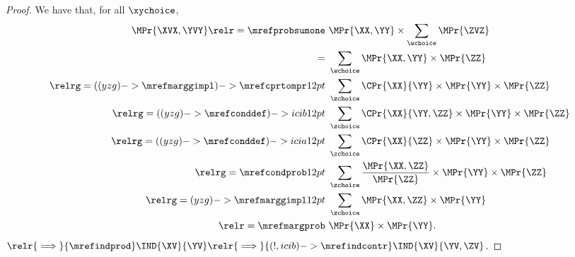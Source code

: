 \begin{proof}
  We have that, for all $\xychoice$,
  \def\cmnmref{(yzg)->\mrefmarggimpl}
  \def\cmnmrefb{(yzg)->\mrefconddef}
  \begin{align*}
    \MPr{\XVX, \YVY} \relr = {\mrefprobsumone} &\ \MPr{\XX, \YY} \times \sum_{\wchoice} \MPr{\ZVZ}\\
    =  &\ \sum_{\wchoice} \MPr{\XX, \YY} \times \MPr{\ZZ}\\
    \relrg = {(\cmnmref)->\mrefcprtompr} 12pt &\ \sum_{\zchoice} \CPr{\XX}{\YY} \times \MPr{\YY} \times \MPr{\ZZ}\\
    \relrg = {(\cmnmrefb)->icib} 12pt &\ \sum_{\zchoice} \CPr{\XX}{\YY, \ZZ} \times \MPr{\YY} \times \MPr{\ZZ}\\
    \relrg = {(\cmnmrefb)->icia} 12pt &\ \sum_{\zchoice} \CPr{\XX}{\ZZ} \times \MPr{\YY} \times \MPr{\ZZ}\\
    \relrg = {\mrefcondprob} 12pt &\ \sum_{\zchoice} \frac{\MPr{\XX, \ZZ}}{\MPr{\ZZ}} \times \MPr{\YY} \times \MPr{\ZZ}\\
    \relrg = {\cmnmref} 12pt &\ \sum_{\zchoice} \MPr{\XX, \ZZ} \times \MPr{\YY}\\
    \relr = {\mrefmargprob} &\ \MPr{\XX} \times \MPr{\YY}.
  \end{align*}
  $\relr {\implies} {\mrefindprod} \IND{\XV}{\YV}
  \relr {\implies} {(!,icib)->\mrefindcontr} \IND{\XV}{\YV,\ZV}$.
\end{proof}
